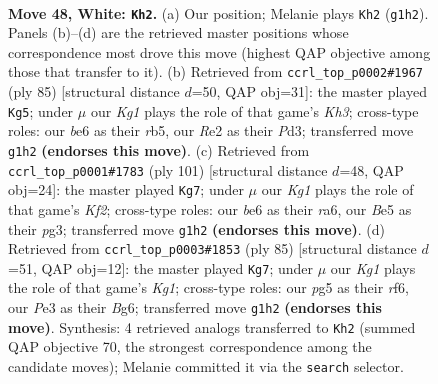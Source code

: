 \documentclass[11pt]{article}
\begin{document}
\clearpage

\begin{figure}[p]\centering
\begin{subfigure}{0.46\textwidth}\centering
\resizebox{\linewidth}{!}{%
\newchessgame
\chessboard[
  setfen={4k3/1R6/2r1b3/1p2B1p1/rn6/4P1PP/4RP2/6K1 w - - 5 48},
  showmover=false,
  pgfstyle=straightmove, color=movearrow, markmove={g1-h2}
]}
\caption{}
\end{subfigure}\hfill
\begin{subfigure}{0.46\textwidth}\centering
\resizebox{\linewidth}{!}{%
\newchessgame
\chessboard[
  setfen={1r6/1P1r3p/6pk/1R3p2/1R6/3p1P2/3K1P1P/8 b - - 5 43},
  showmover=false,
  pgfstyle=straightmove, color=movearrow, markmove={h6-g5}
]}
\caption{}
\end{subfigure}
\\[4pt]
\begin{subfigure}{0.46\textwidth}\centering
\resizebox{\linewidth}{!}{%
\newchessgame
\chessboard[
  setfen={r7/P2rpk2/R4pp1/7p/4K3/6PP/5P2/R7 b - - 31 51},
  showmover=false,
  pgfstyle=straightmove, color=movearrow, markmove={f7-g7}
]}
\caption{}
\end{subfigure}\hfill
\begin{subfigure}{0.46\textwidth}\centering
\resizebox{\linewidth}{!}{%
\newchessgame
\chessboard[
  setfen={6k1/r4p2/P2B1Rb1/1r2p1Pp/7P/R3K3/8/8 b - - 22 43},
  showmover=false,
  pgfstyle=straightmove, color=movearrow, markmove={g8-g7}
]}
\caption{}
\end{subfigure}
\caption{\textbf{Move 48, White: \texttt{Kh2}.} (a) Our position; Melanie plays \texttt{Kh2} (\texttt{g1h2}). Panels (b)--(d) are the retrieved master positions whose correspondence most drove this move (highest QAP objective among those that transfer to it). (b) Retrieved from \texttt{ccrl\_top\_p0002\#1967} (ply 85) [structural distance $d$=50, QAP obj=31]: the master played \texttt{Kg5}; under $\mu$ our \emph{Kg1} plays the role of that game's \emph{Kh3}; cross-type roles: our \emph{b}e6 as their \emph{r}b5, our \emph{R}e2 as their \emph{P}d3; transferred move \texttt{g1h2} \textbf{(endorses this move)}. (c) Retrieved from \texttt{ccrl\_top\_p0001\#1783} (ply 101) [structural distance $d$=48, QAP obj=24]: the master played \texttt{Kg7}; under $\mu$ our \emph{Kg1} plays the role of that game's \emph{Kf2}; cross-type roles: our \emph{b}e6 as their \emph{r}a6, our \emph{B}e5 as their \emph{p}g3; transferred move \texttt{g1h2} \textbf{(endorses this move)}. (d) Retrieved from \texttt{ccrl\_top\_p0003\#1853} (ply 85) [structural distance $d$=51, QAP obj=12]: the master played \texttt{Kg7}; under $\mu$ our \emph{Kg1} plays the role of that game's \emph{Kg1}; cross-type roles: our \emph{p}g5 as their \emph{r}f6, our \emph{P}e3 as their \emph{B}g6; transferred move \texttt{g1h2} \textbf{(endorses this move)}. Synthesis: 4 retrieved analogs transferred to \texttt{Kh2} (summed QAP objective 70, the strongest correspondence among the candidate moves); Melanie committed it via the \texttt{search} selector.}
\label{fig:thought-m94}
\end{figure}
\end{document}
